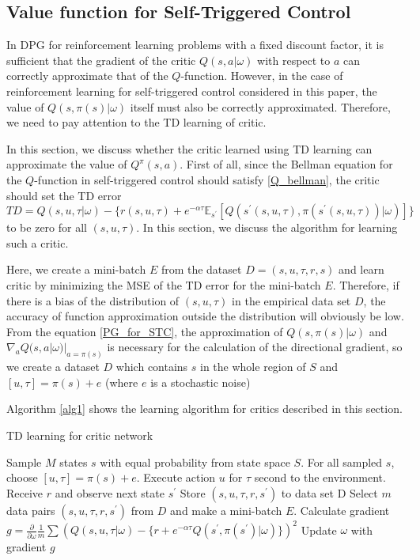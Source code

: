 \documentclass[english, dvipdfmx]{ampmt}             %
\newcommand{\expect}{\mathbb{E}}
\newcommand{\pdif}[2]{\frac{\partial#1}{\partial#2}}
\begin{document}
\subsection{Value function for Self-Triggered Control}
In DPG for reinforcement learning problems with a fixed discount factor, it is sufficient that the gradient of the critic $Q(s,a|\omega)$ with respect to $a$ can correctly approximate that of the $Q$-function. However, in the case of reinforcement learning for self-triggered control considered in this paper, the value of $Q(s,\pi(s)|\omega)$ itself must also be correctly approximated. Therefore, we need to pay attention to the TD learning of critic.\par
In this section, we discuss whether the critic learned using TD learning can approximate the value of $Q^{\pi}(s,a)$. First of all, since the Bellman equation for the $Q$-function in self-triggered control should satisfy \eqref{Q_bellman}, the critic should set the TD error
\begin{equation}
	TD = Q(s,u,\tau|\omega) - \{r(s,u,\tau) + e^{-\alpha\tau}\expect_{s^{\prime}}[Q(s^{\prime}(s,u,\tau), \pi(s^{\prime}(s,u,\tau))|\omega)]\}
\end{equation}
 to be zero for all $(s,u,\tau)$. In this section, we discuss the algorithm for learning such a critic.\par
Here, we create a mini-batch $E$ from the dataset $D={(s,u,\tau,r,s)}$ and learn critic by minimizing the MSE of the TD error for the mini-batch $E$. Therefore, if there is a bias of the distribution of $(s,u,\tau)$ in the empirical data set $D$, the accuracy of function approximation outside the distribution will obviously be low. From the equation \eqref{PG_for_STC}, the approximation of $Q(s, \pi(s)|\omega)$ and $\nabla_aQ(s,a|\omega)|_{a=\pi(s)}$ is necessary for the calculation of the directional gradient, so we create a dataset $D$ which contains $s$ in the whole region of $S$ and $[u,\tau] = \pi(s) + e $ (where $e$ is a stochastic noise)\par
Algorithm \ref{alg1} shows the learning algorithm for critics described in this section.
\begin{algorithm}                      
\caption{TD learning for critic network}         
\label{alg1}                          
\begin{algorithmic}                  
    \STATE Sample $M$ states $s$ with equal probability from state space $S$.
    	\STATE For all sampled $s$, choose $[u, \tau]=\pi(s) + e$.
	\STATE Execute action $u$ for $\tau$ second to the environment.
	\STATE Receive $r$ and observe next state $s^{\prime}$
	\STATE Store $(s, u, \tau, r, s^{\prime})$ to data set D
    \ENDFOR
    	\STATE Select $m$ data pairs $(s, u, \tau, r, s^{\prime})$ from $D$ and make a mini-batch $E$.
	\STATE Calculate gradient $g = \pdif{}{\omega} \frac{1}{m}\sum\left(Q(s,u,\tau|\omega) - \{r + e^{-\alpha\tau}Q(s^{\prime}, \pi(s^{\prime})|\omega)\}\right)^2$
	\STATE Update $\omega$ with gradient $g$
    \ENDFOR
    \end{algorithmic}
\end{algorithm}
\end{document}
